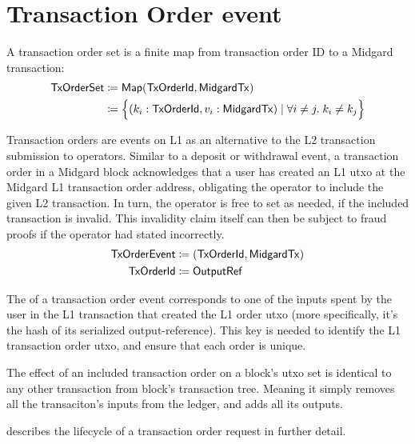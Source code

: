 \documentclass[../midgard.tex]{subfiles}
\begin{document}
\section{Transaction Order event}
\label{h:tx-order-event}

A transaction order set is a finite map from transaction order ID to a Midgard transaction:
\begin{align*}
    \mathsf{TxOrderSet} &\coloneq \mathsf{Map(TxOrderId, MidgardTx)} \\
      &\coloneq \Bigl\{
        (k_i: \mathsf{TxOrderId}, v_i: \mathsf{MidgardTx}) \mid \forall i \neq j.\; k_i \neq k_j
    \Bigr\}
\end{align*}

Transaction orders are events on L1 as an alternative to the L2 transaction submission to operators.
Similar to a deposit or withdrawal event, a transaction order in a Midgard block acknowledges that a user has created an L1 utxo at the Midgard L1 transaction order address, obligating the operator to include the given L2 transaction.
In turn, the operator is free to set  as needed, if the included transaction is invalid.
This invalidity claim itself can then be subject to fraud proofs if the operator had stated incorrectly.
\begingroup
\allowdisplaybreaks{}
\begin{align*}
    \mathsf{TxOrderEvent} &\coloneq \mathsf{(TxOrderId, MidgardTx)} \\
    \mathsf{TxOrderId} &\coloneq \mathsf{OutputRef}
\end{align*}
\endgroup

The  of a transaction order event corresponds to one of the inputs spent by the user in the L1 transaction that created the L1 order utxo (more specifically, it's the hash of its serialized output-reference).
This key is needed to identify the L1 transaction order utxo, and ensure that each order is unique.

The effect of an included transaction order on a block's utxo set is identical to any other transaction from block's transaction tree.
Meaning it simply removes all the transaciton's inputs from the ledger, and adds all its outputs.

 describes the lifecycle of a transaction order request in further detail.
\end{document}
